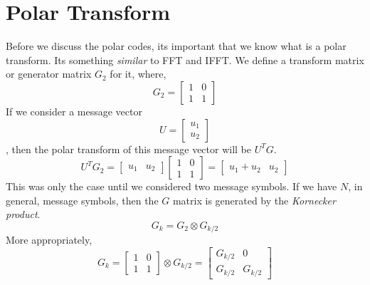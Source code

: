 \documentclass[twocolumn]{report}
\begin{document}
\section{Polar Transform}
Before we discuss the polar codes, its important that we know what is a polar transform. Its something \textit{similar} to FFT and IFFT. We define a transform matrix or generator matrix $G_{2}$ for it, where,
\[
G_{2}=
\begin{bmatrix}
1 & 0 \\
1 & 1
\end{bmatrix}
\]
If we consider a message vector \[ U = \begin{bmatrix} u_{1} \\ u_{2} \end{bmatrix} \], then the polar transform of this message vector will be $U^{T}G$.
\[
U^{T}G_{2} = 
\begin{bmatrix}
u_{1} &
u_{2}
\end{bmatrix}
\begin{bmatrix}
1 & 0 \\
1 & 1
\end{bmatrix}
= 
\begin{bmatrix}
u_{1} + u_{2} &
u_{2}
\end{bmatrix}
\]
This was only the case until we considered two message symbols. If we have $N$, in general, message symbols, then the $G$ matrix is generated by the \textit{Kornecker product}.
\begin{equation}
G_{k} = G_{2} \otimes G_{k/2}
\end{equation}
More appropriately,
\[
G_{k} = 
\begin{bmatrix}
1 & 0 \\
1 & 1
\end{bmatrix}
\otimes
G_{k/2}
= 
\begin{bmatrix}
G_{k/2} & 0 \\
G_{k/2} & G_{k/2}
\end{bmatrix}
\]
\end{document}
